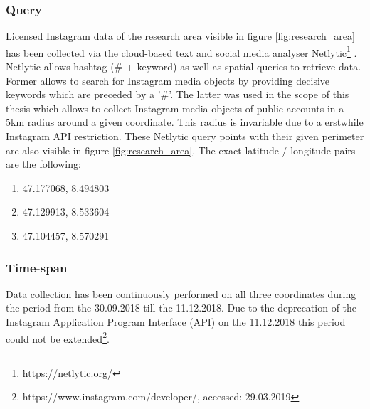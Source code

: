 \subsubsection*{Query} \label{netlytic}
Licensed Instagram data of the research area visible in figure \ref{fig:research_area} has been collected via the cloud-based text and social media analyser Netlytic\footnote{https://netlytic.org/} \parencite{Gruzd2016}. Netlytic allows hashtag (\# + keyword) as well as spatial queries to retrieve data. Former allows to search for Instagram media objects by providing decisive keywords which are preceded by a '\#'. The latter was used in the scope of this thesis which allows to collect Instagram media objects of public accounts in a 5km radius around a given coordinate. This radius is invariable due to a erstwhile Instagram API restriction. These Netlytic query points with their given perimeter are also visible in figure \ref{fig:research_area}. The exact latitude / longitude pairs are the following:\\
\begin{enumerate}
  \item 47.177068, 8.494803
  \item 47.129913, 8.533604
  \item 47.104457, 8.570291
\end{enumerate}

\subsubsection*{Time-span} \label{Instagram_timespan}
Data collection has been continuously performed on all three coordinates during the period from the 30.09.2018 till the 11.12.2018. Due to the deprecation of the Instagram Application Program Interface (API) on the 11.12.2018 this period could not be extended\footnote{https://www.instagram.com/developer/, accessed: 29.03.2019}.

